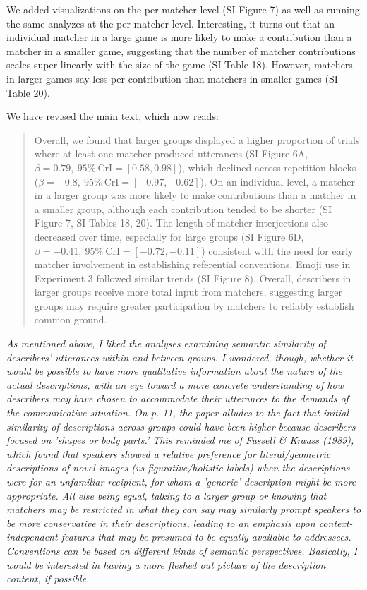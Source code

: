 \documentclass{stanfordletter}
\newcommand{\theysaid}[1]{\begin{leftbar} \noindent 
		\textsl{ #1}\end{leftbar}}
\newcommand{\revised}[1]{\begin{quote}	#1 \end{quote}}
\begin{document}
\begin{letter}{}
          We added visualizations on the per-matcher level  (SI Figure 7) as well as running the same analyzes at the per-matcher level. Interesting, it turns out that an individual matcher in a large game is more likely to make a contribution than a matcher in a smaller game, suggesting that the number of matcher contributions scales super-linearly with the size of the game (SI Table 18). However, matchers in larger games say less per contribution than matchers in smaller games (SI Table 20). 
         
          We have revised the main text, which now reads:
          
          \revised{Overall, we found that larger groups displayed a higher proportion of trials where at least one matcher produced utterances (SI Figure 6A, \(\beta=0.79,\:95\%\:\mathrm{CrI}=[0.58, 0.98]\)), which declined across repetition blocks (\(\beta=-0.8,\:95\%\:\mathrm{CrI}=[-0.97, -0.62]\)). On an individual level, a matcher in a larger group was more likely to make contributions than a matcher in a smaller group, although each contribution tended to be shorter (SI Figure 7, SI Tables 18, 20).
          	The length of matcher interjections also decreased over time, especially for large groups (SI Figure 6D, \(\beta=-0.41,\:95\%\:\mathrm{CrI}=[-0.72, -0.11]\)) consistent with the need for early matcher involvement in establishing referential conventions.
          	Emoji use in Experiment 3 followed similar trends (SI Figure 8).
          	Overall, describers in larger groups receive more total input from matchers, suggesting larger groups may require greater participation by matchers to reliably establish common ground.}
         
          
          \theysaid{As mentioned above, I liked the analyses examining semantic similarity of describers' utterances within and between groups. I wondered, though, whether it would be possible to have more qualitative information about the nature of the actual descriptions, with an eye toward a more concrete understanding of how describers may have chosen to accommodate their utterances to the demands of the communicative situation. On p. 11, the paper alludes to the fact that initial similarity of descriptions across groups could have been higher because describers focused on 'shapes or body parts.' This reminded me of Fussell \& Krauss (1989), which found that speakers showed a relative preference for literal/geometric descriptions of novel images (vs figurative/holistic labels) when the descriptions were for an unfamiliar recipient, for whom a 'generic' description might be more appropriate. All else being equal, talking to a larger group or knowing that matchers may be restricted in what they can say may similarly prompt speakers to be more conservative in their descriptions, leading to an emphasis upon context-independent features that may be presumed to be equally available to addressees. Conventions can be based on different kinds of semantic perspectives. Basically, I would be interested in having a more fleshed out picture of the description content, if possible.}



\end{letter}
\end{document}
